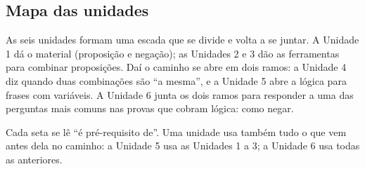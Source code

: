 \subsection*{Mapa das unidades}
As seis unidades formam uma escada que se divide e volta a se juntar. A Unidade 1 dá o material (proposição e negação); as Unidades 2 e 3 dão as ferramentas para combinar proposições. Daí o caminho se abre em dois ramos: a Unidade 4 diz quando duas combinações são \enquote{a mesma}, e a Unidade 5 abre a lógica para frases com variáveis. A Unidade 6 junta os dois ramos para responder a uma das perguntas mais comuns nas provas que cobram lógica: como negar.
\begin{center}
\end{center}
{\small\noindent Cada seta se lê \enquote{é pré-requisito de}. Uma unidade usa também tudo o que vem antes dela no caminho: a Unidade 5 usa as Unidades 1 a 3; a Unidade 6 usa todas as anteriores.}

